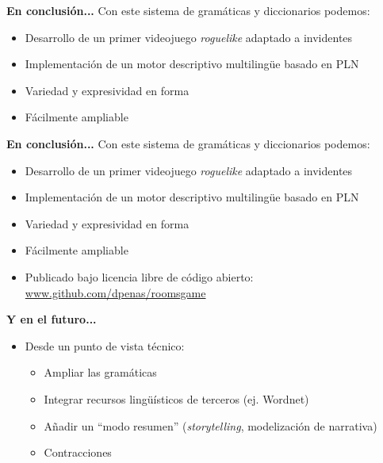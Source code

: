 \begin{tframe}{\textbf{En conclusión...}}
	Con este sistema de gramáticas y diccionarios podemos:
	\begin{itemize}
		\item Desarrollo de un primer videojuego \textit{roguelike} adaptado a invidentes
		\item Implementación de un motor descriptivo multilingüe basado en PLN
		\item Variedad y expresividad en forma
		\item<+-| alert@+> Fácilmente ampliable
	\end{itemize}
\end{tframe}

\begin{tframe}{\textbf{En conclusión...}}
	Con este sistema de gramáticas y diccionarios podemos:
	\begin{itemize}
		\item Desarrollo de un primer videojuego \textit{roguelike} adaptado a invidentes
		\item Implementación de un motor descriptivo multilingüe basado en PLN
		\item Variedad y expresividad en forma
		\item Fácilmente ampliable
		\item<+-| alert@+> Publicado bajo licencia libre de código abierto: \url{www.github.com/dpenas/roomsgame}
	\end{itemize}
\end{tframe}

\begin{tframe}{\textbf{Y en el futuro...}}
	\begin{itemize}
		\item<+-| alert@+> Desde un punto de vista técnico:
			\begin{itemize}
				\item Ampliar las gramáticas
				\item Integrar recursos lingüísticos de terceros (ej. Wordnet)
				\item Añadir un ``modo resumen'' (\textit{storytelling}, modelización de narrativa)
				\item Contracciones
			\end{itemize}
	\end{itemize}
\end{tframe}

